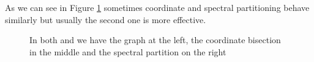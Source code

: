 \documentclass[]{usiinfbachelorproject}
\begin{document}
As we can see in Figure \ref{fig:partitioning} sometimes coordinate and spectral partitioning behave similarly but usually the second one is more effective.
\begin{figure}[ht]
	\centering
	\caption{In both  and  we have the graph at the left, the coordinate bisection in the middle and the spectral partition on the right}
	\label{fig:partitioning}
\end{figure}
\end{document}

